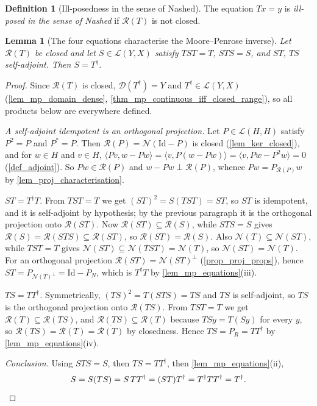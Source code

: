 \documentclass[a4paper]{report}
\theoremstyle{plain}
\newtheorem{lemma}[theorem]{Lemma}
\theoremstyle{definition}
\newtheorem{definition}[theorem]{Definition}
\theoremstyle{remark}
\newcommand{\Ll}{\mathcal{L}}
\newcommand{\Ran}{\mathcal{R}}
\newcommand{\Ker}{\mathcal{N}}
\newcommand{\Dom}{\mathcal{D}}
\newcommand{\Id}{\mathrm{Id}}
\newcommand{\dg}{^{\dagger}}
\begin{document}
\begin{definition}[Ill-posedness in the sense of Nashed]
  \label{def_nashed}
  The equation $Tx = y$ is \emph{ill-posed in the sense of Nashed} if $\Ran(T)$ is not
  closed.
\end{definition}


\begin{lemma}[The four equations characterise the Moore--Penrose inverse]
  \label{lem_mp_characterisation}
  Let $\Ran(T)$ be closed and let $S \in \Ll(Y,X)$ satisfy $TST = T$, $STS = S$, and
  $ST$, $TS$ self-adjoint.  Then $S = T\dg$.
\end{lemma}

\begin{proof}
  Since $\Ran(T)$ is closed, $\Dom(T\dg) = Y$ and $T\dg \in \Ll(Y,X)$
  (\cref{lem_mp_domain_dense}, \cref{thm_mp_continuous_iff_closed_range}), so all products
  below are everywhere defined.

  \emph{A self-adjoint idempotent is an orthogonal projection.}  Let $P \in \Ll(H,H)$
  satisfy $P^2 = P$ and $P^{*} = P$.  Then $\Ran(P) = \Ker(\Id - P)$ is closed
  (\cref{lem_ker_closed}), and for $w \in H$ and $v \in H$,
  $\langle Pv, w - Pw\rangle = \langle v, P(w - Pw)\rangle = \langle v, Pw - P^2w\rangle
  = 0$ (\cref{def_adjoint}).  So $Pw \in \Ran(P)$ and $w - Pw \perp \Ran(P)$, whence
  $Pw = P_{\Ran(P)}w$ by \cref{lem_proj_characterisation}.

  \emph{$ST = T\dg T$.}  From $TST = T$ we get $(ST)^2 = S(TST) = ST$, so $ST$ is
  idempotent, and it is self-adjoint by hypothesis; by the previous paragraph it is the
  orthogonal projection onto $\Ran(ST)$.  Now $\Ran(ST) \subseteq \Ran(S)$, while
  $STS = S$ gives $\Ran(S) = \Ran(STS) \subseteq \Ran(ST)$, so $\Ran(ST) = \Ran(S)$.
  Also $\Ker(T) \subseteq \Ker(ST)$, while $TST = T$ gives
  $\Ker(ST) \subseteq \Ker(TST) = \Ker(T)$, so $\Ker(ST) = \Ker(T)$.  For an orthogonal
  projection $\Ran(ST) = \Ker(ST)^{\perp}$ (\cref{prop_proj_props}), hence
  $ST = P_{\Ker(T)^{\perp}} = \Id - P_N$, which is $T\dg T$ by
  \cref{lem_mp_equations}(iii).

  \emph{$TS = TT\dg$.}  Symmetrically, $(TS)^2 = T(STS) = TS$ and $TS$ is self-adjoint, so
  $TS$ is the orthogonal projection onto $\Ran(TS)$.  From $TST = T$ we get
  $\Ran(T) \subseteq \Ran(TS)$, and $\Ran(TS) \subseteq \Ran(T)$ because
  $TSy = T(Sy)$ for every $y$, so
  $\Ran(TS) = \Ran(T) = \overline{\Ran(T)}$ by closedness.  Hence $TS = P_R = TT\dg$ by
  \cref{lem_mp_equations}(iv).

  \emph{Conclusion.}  Using $STS = S$, then $TS = TT\dg$, then
  \cref{lem_mp_equations}(ii),
  \[
    S = S(TS) = S\,TT\dg = (ST)T\dg = T\dg T T\dg = T\dg . \qedhere
  \]
\end{proof}
\end{document}
